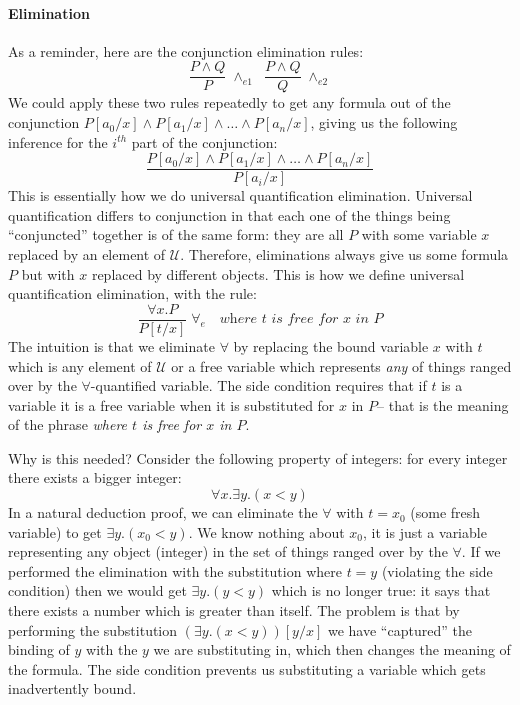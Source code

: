 \paragraph{Elimination} As a reminder, here
are the conjunction elimination rules:
%
\begin{equation*}
\dfrac{P \wedge Q}
        {P} \; {\wedge_{e1}}
\;\;
\dfrac{P \wedge Q}
  {Q} \; {\wedge_{e2}}
\end{equation*}
%
We could apply these two
rules repeatedly to get any formula out of the conjunction
$P[a_0/x] \wedge P[a_1/x] \wedge
\ldots \wedge P[a_{n}/x]$, giving us the following inference for
the $i^{th}$ part of the conjunction:
%
\begin{equation*}
  \dfrac{P[a_0/x] \wedge P[a_1/x] \wedge \ldots \wedge P[a_{n}/x]}
  {P[a_i/x]}
\end{equation*}
%
This is essentially how we do universal quantification elimination.
Universal quantification differs to conjunction in that each one of the things
being ``conjuncted'' together is of the same form: they are all $P$
with some variable $x$ replaced by an element of $\mathcal{U}$.
Therefore, eliminations
always give us some formula $P$ but with $x$ replaced by different objects. This is how
we define universal quantification elimination, with the rule:
%
\begin{equation*}
  \dfrac{\forall x . P}
  {P [t/x]} \; {\forall_e} \quad \textit{where $t$ is free for $x$ in $P$}
\end{equation*}
%
The intuition is that we eliminate $\forall$ by replacing the bound
variable $x$ with $t$ which is any element of $\mathcal{U}$ or a
 free variable which represents
\emph{any} of things ranged over by the $\forall$-quantified variable.
The side condition requires that if $t$ is a variable it is a free variable
 when it is substituted for $x$ in $P$-- that is the meaning of the
 phrase \emph{where $t$ is free for $x$ in $P$}.

 Why is this needed? Consider the following property of integers: for
every integer there exists a bigger integer:
%
\begin{equation*}
  \forall x . \exists y . (x < y)
\end{equation*}
In a natural deduction proof, we can eliminate the $\forall$ with
$t = x_0$ (some fresh variable) to get $\exists y . (x_0 < y)$. We
know nothing about $x_0$, it is just a variable representing any
object (integer) in the set of things ranged over by the $\forall$.
If we performed the elimination with the substitution where
$t = y$ (violating the side condition) then we would get
$\exists y . (y < y)$ which is no longer true: it says that there
exists a number which is greater than itself. The problem is that by
performing the substitution $(\exists y. (x < y))[y/x]$ we have
``captured'' the binding of $y$ with the $y$ we are substituting in,
which then changes the meaning of the formula. The
side condition prevents us substituting a variable which
gets inadvertently bound.

